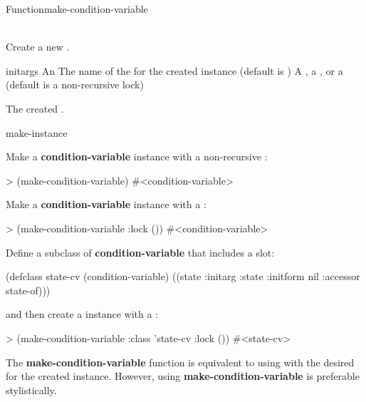 \begin{functiondoc}{Function}{make-condition-variable}%
  {  \\ 
     \\
   \returns{} }
%
%
%
 
\fnsyntax

\fnpurpose Create a new .

\fnpackage {}

\fnmodule {}

\fnargs
\begin{args}{initargs}
\arg[initargs] An 
\arg[class] The name of the  for the created
 instance (default is )
\arg[lock] A , a , or a 
 (default is a non-recursive lock)
\end{args}

\fnreturns
The created \textbf{}.

\begin{alsos}{make-instance}
\end{alsos}

\fnexamples
Make a \textbf{condition-variable} instance with a non-recursive 
:
\begin{example}
> (make-condition-variable)
#<condition-variable>
\end{example}

Make a \textbf{condition-variable} instance with a
:
\begin{example}
> (make-condition-variable :lock ())
#<condition-variable>
\end{example}

Define a subclass of \textbf{condition-variable} that includes a 
 slot:
\begin{example}
  (defclass state-cv (condition-variable)
    ((state :initarg :state
            :initform nil
            :accessor state-of)))
\end{example}
and then create a  instance with a :
\begin{example}
> (make-condition-variable :class 'state-cv
                           :lock ())
#<state-cv>
\end{example}

\fnnote The \textbf{make-condition-variable} function is equivalent to using
\textbf{} with the desired  for the
created  instance.  However, using
\textbf{make-condition-variable} is preferable stylistically.

\end{functiondoc}

